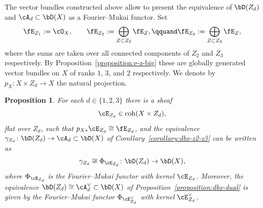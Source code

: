 \documentclass[11pt]{amsart}
\DeclareMathOperator{\coh}{\mathrm{coh}}
\theoremstyle{plain}
\newtheorem{proposition}[theorem]{Proposition}
\theoremstyle{definition}
\theoremstyle{remark}
\begin{document}
The vector bundles constructed above allow to present the equivalence of $\bD(Z_d)$ and $\cA_d \subset \bD(X)$ as a Fourier--Mukai functor.
Set 
\begin{equation}\label{eq:cezd}
\fE_{Z_1} := \cO_X,
\qquad
\fE_{Z_2} := \bigoplus_{Z \subset Z_2} \fE_Z,
\qquand
\fE_{Z_3} := \bigoplus_{Z \subset Z_3} \fE_Z,
\end{equation}
where the sums are taken over all connected components of $Z_2$ and $Z_3$ respectively.
By Proposition~\ref{proposition:e-z-big} these are globally generated vector bundles on $X$ of ranks $1$, $3$, and $2$ respectively.
We denote by~\mbox{$p_X \colon X \times Z_d \to X$} the natural projection.

\begin{proposition}
\label{proposition:fm-zd}
For each $d \in \{1,2,3\}$ there is a sheaf 
\begin{equation*}
\cE_{Z_d} \in \coh(X \times Z_d),
\end{equation*}
flat over $Z_d$, such that $p_{X*}\cE_{Z_d} \cong \fE_{Z_d}$, and the equivalence $\gamma_{Z_d} \colon \bD(Z_d) \to \cA_d \subset \bD(X)$ of Corollary~\textup{\ref{corollary:dbx-z2-z3}} can be written as
\begin{equation*}
\gamma_{Z_d} \cong \Phi_{\cE_{Z_d}} \colon \bD(Z_d) \to \bD(X),
\end{equation*}
where $\Phi_{\cE_{Z_d}}$ is the Fourier--Mukai functor with kernel $\cE_{Z_d}$.
Moreover, the equivalence \mbox{$\bD(Z_d) \cong \cA_d^\vee \subset \bD(X)$} of Proposition~\textup{\ref{proposition:dbx-dual}} is given by the Fourier--Mukai functor $\Phi_{\cE_{Z_d}^\vee}$ with kernel $\cE_{Z_d}^\vee$.
\end{proposition}
\end{document}
